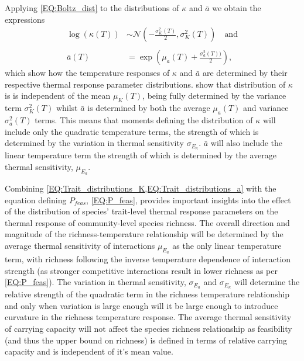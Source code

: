 \documentclass{article}
\begin{document}
Applying \cref{EQ:Boltz_dist} to the distributions of $\kappa$ and $\bar{a}$ we obtain the expressions
\begin{align} 
        \log(\kappa(T)) &\sim \mathcal{N}\left( -\frac{\sigma_{K}^2(T)}{2} , \sigma_{K}^2(T) \right) \quad \text{and} \label{EQ:Trait_distributions_K} \\ \nonumber \\
        \bar{a}(T) &= \exp \left(\mu_a(T) + \frac{\sigma_a^2(T))}{2} \right) \label{EQ:Trait_distributions_a},
\end{align}
which show how the temperature responses of $\kappa$ and $\bar{a}$ are determined by their respective thermal response parameter distributions.  show that distribution of $\kappa$ is is independent of the mean $\mu_{K}(T)$, being fully determined by the variance term $\sigma_{K}^2(T)$ whilst $\bar{a}$ is determined by both the average $\mu_a(T)$ and variance $\sigma_a^2(T)$ terms. This means that moments defining the distribution of $\kappa$ will include only the quadratic temperature terms, the strength of which is determined by the variation in thermal sensitivity $\sigma_{E_{\kappa}}$. $\bar{a}$ will also include the linear temperature term the strength of which is determined by the average thermal sensitivity, $\mu_{E_a}$. 

Combining \cref{EQ:Trait_distributions_K,EQ:Trait_distributions_a} with the equation defining $P_{feas}$, \cref{EQ:P_feas}, provides important insights into the effect of the distribution of species' trait-level thermal response parameters on the thermal response of community-level species richness. The overall direction and magnitude of the richness-temperature relationship will be determined by the average thermal sensitivity of interactions $\mu_{E_a}$ as the only linear temperature term, with richness following the inverse temperature dependence of interaction strength (as stronger competitive interactions result in lower richness as per \cref{EQ:P_feas}). The variation in thermal sensitivity, $\sigma_{E_a}$ and $\sigma_{E_{\kappa}}$ will determine the relative strength of the quadratic term in the richness temperature relationship and only when variation is large enough will it be large enough to introduce curvature in the richness temperature response. The average thermal sensitivity of carrying capacity will not affect the species richness relationship as feasibility (and thus the upper bound on richness) is defined in terms of relative carrying capacity and is independent of it's mean value. 
\end{document}
